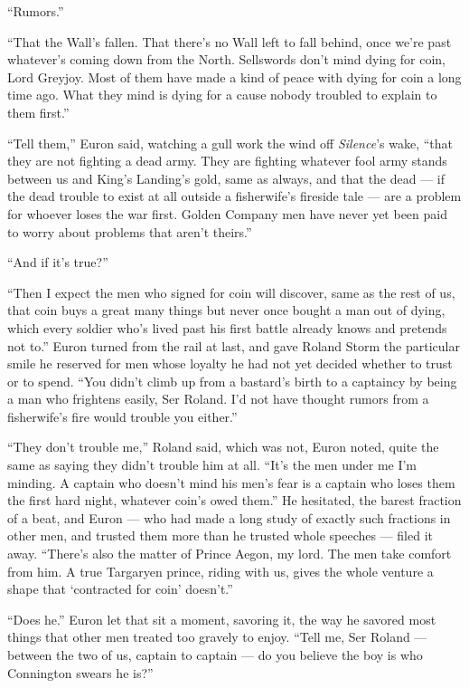 “Rumors.”

“That the Wall’s fallen. That there’s no Wall left to fall behind, once we’re past whatever’s coming down from the North. Sellswords don’t mind dying for coin, Lord Greyjoy. Most of them have made a kind of peace with dying for coin a long time ago. What they mind is dying for a cause nobody troubled to explain to them first.”

“Tell them,” Euron said, watching a gull work the wind off \textit{Silence}’s wake, “that they are not fighting a dead army. They are fighting whatever fool army stands between us and King’s Landing’s gold, same as always, and that the dead — if the dead trouble to exist at all outside a fisherwife’s fireside tale — are a problem for whoever loses the war first. Golden Company men have never yet been paid to worry about problems that aren’t theirs.”

“And if it’s true?”

“Then I expect the men who signed for coin will discover, same as the rest of us, that coin buys a great many things but never once bought a man out of dying, which every soldier who’s lived past his first battle already knows and pretends not to.” Euron turned from the rail at last, and gave Roland Storm the particular smile he reserved for men whose loyalty he had not yet decided whether to trust or to spend. “You didn’t climb up from a bastard’s birth to a captaincy by being a man who frightens easily, Ser Roland. I’d not have thought rumors from a fisherwife’s fire would trouble you either.”

“They don’t trouble me,” Roland said, which was not, Euron noted, quite the same as saying they didn’t trouble him at all. “It’s the men under me I’m minding. A captain who doesn’t mind his men’s fear is a captain who loses them the first hard night, whatever coin’s owed them.” He hesitated, the barest fraction of a beat, and Euron — who had made a long study of exactly such fractions in other men, and trusted them more than he trusted whole speeches — filed it away. “There’s also the matter of Prince Aegon, my lord. The men take comfort from him. A true Targaryen prince, riding with us, gives the whole venture a shape that ‘contracted for coin’ doesn’t.”

“Does he.” Euron let that sit a moment, savoring it, the way he savored most things that other men treated too gravely to enjoy. “Tell me, Ser Roland — between the two of us, captain to captain — do you believe the boy is who Connington swears he is?”

